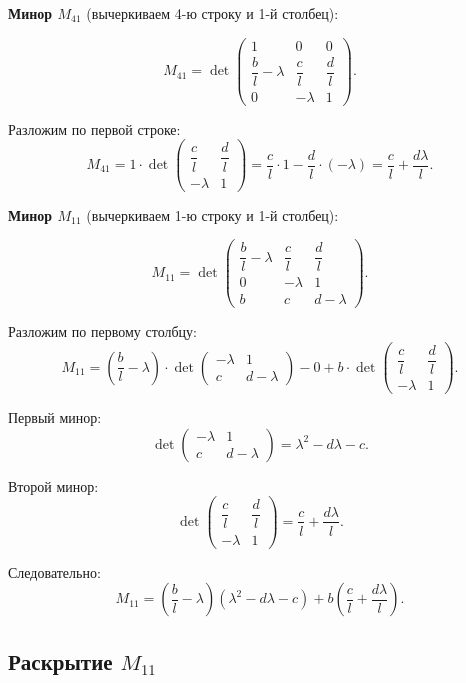 \documentclass[a4paper, 12pt]{article}
\begin{document}
\textbf{Минор $M_{41}$} (вычеркиваем 4-ю строку и 1-й столбец):

\[
M_{41} = \det
\begin{pmatrix}
1 & 0 & 0 \\[1em]
\dfrac{b}{l} - \lambda & \dfrac{c}{l} & \dfrac{d}{l} \\[1em]
0 & -\lambda & 1
\end{pmatrix}.
\]

Разложим по первой строке:
\[
M_{41} = 1 \cdot \det \begin{pmatrix} \dfrac{c}{l} & \dfrac{d}{l} \\ -\lambda & 1 \end{pmatrix} = \frac{c}{l} \cdot 1 - \frac{d}{l} \cdot (-\lambda) = \frac{c}{l} + \frac{d\lambda}{l}.
\]

\textbf{Минор $M_{11}$} (вычеркиваем 1-ю строку и 1-й столбец):

\[
M_{11} = \det
\begin{pmatrix}
\dfrac{b}{l} - \lambda & \dfrac{c}{l} & \dfrac{d}{l} \\[1em]
0 & -\lambda & 1 \\[1em]
b & c & d - \lambda
\end{pmatrix}.
\]

Разложим по первому столбцу:
\[
M_{11} = \left( \frac{b}{l} - \lambda \right) \cdot \det \begin{pmatrix} -\lambda & 1 \\ c & d - \lambda \end{pmatrix} - 0 + b \cdot \det \begin{pmatrix} \dfrac{c}{l} & \dfrac{d}{l} \\ -\lambda & 1 \end{pmatrix}.
\]

Первый минор:
\[
\det \begin{pmatrix} -\lambda & 1 \\ c & d - \lambda \end{pmatrix} = \lambda^2 - d\lambda - c.
\]

Второй минор:
\[
\det \begin{pmatrix} \dfrac{c}{l} & \dfrac{d}{l} \\ -\lambda & 1 \end{pmatrix} = \frac{c}{l} + \frac{d\lambda}{l}.
\]

Следовательно:
\[
M_{11} = \left( \frac{b}{l} - \lambda \right) (\lambda^2 - d\lambda - c) + b \left( \frac{c}{l} + \frac{d\lambda}{l} \right).
\]

\subsection{Раскрытие $M_{11}$}
\end{document}
